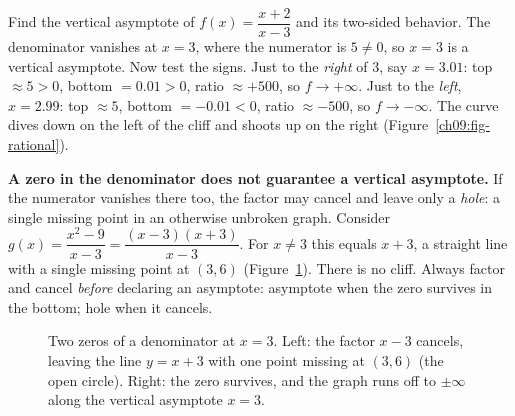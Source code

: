 \begin{labbox}
Find the vertical asymptote of $f(x)=\dfrac{x+2}{x-3}$ and its two-sided
behavior. The denominator vanishes at $x=3$, where the numerator is $5\ne 0$, so
$x=3$ is a vertical asymptote. Now test the signs. Just to the \emph{right} of
$3$, say $x=3.01$: top $\approx 5>0$, bottom $=0.01>0$, ratio $\approx +500$, so
$f\to+\infty$. Just to the \emph{left}, $x=2.99$: top $\approx 5$, bottom
$=-0.01<0$, ratio $\approx -500$, so $f\to-\infty$. The curve dives down on the
left of the cliff and shoots up on the right (Figure~\ref{ch09:fig-rational}).
\end{labbox}

\begin{trapbox}
\textbf{A zero in the denominator does not guarantee a vertical asymptote.}
If the numerator vanishes there too, the factor may cancel and leave only a
\emph{hole}: a single missing point in an otherwise unbroken graph.
Consider $g(x)=\dfrac{x^2-9}{x-3}=\dfrac{(x-3)(x+3)}{x-3}$. For
$x\ne 3$ this equals $x+3$, a straight line with a single missing point at
$(3,6)$ (Figure~\ref{ch09:fig-hole}). There is no cliff. Always factor and
cancel \emph{before} declaring an asymptote: asymptote when the zero survives
in the bottom; hole when it cancels.
\end{trapbox}

\begin{figure}[htbp]
\centering
{}
\caption{Two zeros of a denominator at $x=3$. Left: the factor $x-3$ cancels,
leaving the line $y=x+3$ with one point missing at $(3,6)$ (the open circle).
Right: the zero survives, and the graph runs off to $\pm\infty$ along the
vertical asymptote $x=3$.}
\label{ch09:fig-hole}
\end{figure}

